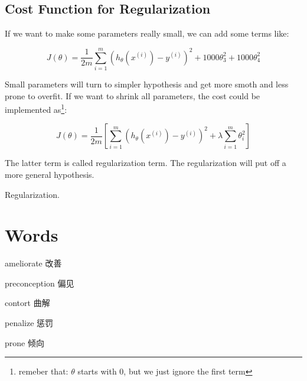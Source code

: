 \documentclass[black,simple]{../elegantbook}
\begin{document}
\subsection{Cost Function for Regularization}

If we want to make some parameters really small, we can add some terms like:

\[J(\theta) = \frac{1}{2m}\sum_{i=1}^m(h_\theta(x^(i)) - y^{(i)})^2
+ 1000 \theta_3^2 + 1000 \theta_4^2
\]

Small parameters will turn to simpler hypothesis and get more smoth and less prone to overfit. If we want to shrink all parameters, the cost could be implemented as\footnote{remeber that: \(\theta\) starts with 0, but we just ignore the first term }:

\[J(\theta) = \frac{1}{2m}\left[\sum_{i=1}^m(h_\theta(x^(i)) - y^{(i)})^2 + \lambda \sum_{i=1}^m\theta_i^2 \right]

\]

The latter term is called regularization term. The regularization will put off a more general hypothesis.

Regularization.

\section*{Words}

ameliorate 改善

preconception 偏见

contort 曲解

penalize 惩罚

prone 倾向





\let\chapname\undefined
\ifx\mainclass\undefined
\end{document}
